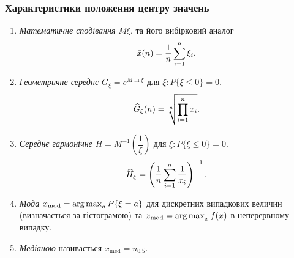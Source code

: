 \subsubsection{Характеристики положення центру значень}

\begin{enumerate}
	\item \textit{Математичне сподівання} $M\xi$, та його вибірковий аналог \[\bar{x}(n) = \dfrac{1}{n}\displaystyle\sum\limits_{i=1}^n \xi_i.\]

	\item \textit{Геометричне середнє} $G_\xi = e^{M \ln \xi}$ для $\xi: P\{\xi \le 0\} = 0$. \[\widehat{G}_\xi(n) = \sqrt[n]{\displaystyle\prod\limits_{i=1}^n x_i}.\]

	\item \textit{Середнє гармонічне} $H = M^{-1}\left(\dfrac{1}{\xi}\right)$ для $\xi: P\{\xi \le 0\} = 0$. \[\widehat{H}_\xi = \left( \dfrac{1}{n} \displaystyle\sum\limits_{i=1}^n \dfrac{1}{x_i}\right)^{-1}.\]
	
	\item \textit{Мода} $x_{\text{mod}}=\operatorname*{arg\,max}_a P\{\xi = a\}$ для дискретних випадкових величин (визначається за гістограмою) та $x_{\text{mod}}=\operatorname*{arg\,max}_x f(x)$ в неперервному випадку.
	
	\item \textit{Медіаною} називається $x_\text{med} = u_{0.5}$.
\end{enumerate}